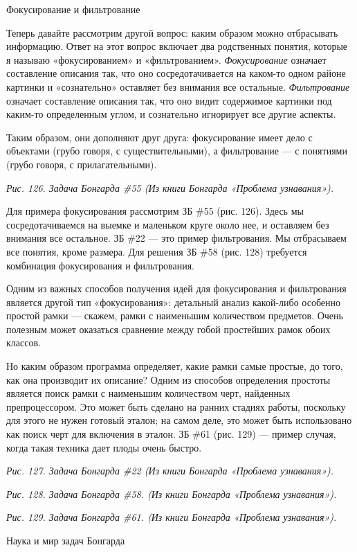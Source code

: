 \documentclass[../main.tex]{subfiles}
\begin{document}
Фокусирование и фильтрование

Теперь давайте рассмотрим другой вопрос: каким образом можно отбрасывать информацию. Ответ на этот вопрос включает два родственных понятия, которые я называю «фокусированием» и «фильтрованием». \emph{Фокусирование} означает составление описания так, что оно сосредотачивается на каком-то одном районе картинки и «сознательно» оставляет без внимания все остальные. \emph{Фильтрование} означает составление описания так, что оно видит содержимое картинки под каким-то определенным углом, и сознательно игнорирует все другие аспекты.

Таким образом, они дополняют друг друга: фокусирование имеет дело с объектами (грубо говоря, с существительными), а фильтрование --- с понятиями (грубо говоря, с прилагательными).

\emph{Рис. 126. Задача Бонгарда \#55 (Из книги Бонгарда «Проблема узнавания»).}

Для примера фокусирования рассмотрим ЗБ \#55 (рис. 126). Здесь мы сосредотачиваемся на выемке и маленьком круге около нее, и оставляем без внимания все остальное. ЗБ \#22 --- это пример фильтрования. Мы отбрасываем все понятия, кроме размера. Для решения ЗБ \#58 (рис. 128) требуется комбинация фокусирования и фильтрования.

Одним из важных способов получения идей для фокусирования и фильтрования является другой тип «фокусирования»: детальный анализ какой-либо особенно простой рамки --- скажем, рамки с наименьшим количеством предметов. Очень полезным может оказаться сравнение между гобой простейших рамок обоих классов.

Но каким образом программа определяет, какие рамки самые простые, до того, как она производит их описание? Одним из способов определения простоты является поиск рамки с наименьшим количеством черт, найденных препроцессором. Это может быть сделано на ранних стадиях работы, поскольку для этого не нужен готовый эталон; на самом деле, это может быть использовано как поиск черт для включения в эталон. ЗБ \#61 (рис. 129) --- пример случая, когда такая техника дает плоды очень быстро.

\emph{Рис. 127. Задача Бонгарда \#22 (Из книги Бонгарда «Проблема узнавания»).}

\emph{Рис. 128. Задача Бонгарда \#58. (Из книги Бонгарда «Проблема узнавания»).}

\emph{Рис. 129. Задача Бонгарда \#61. (Из книги Бонгарда «Проблема узнавания»).}

Наука и мир задач Бонгарда
\end{document}
